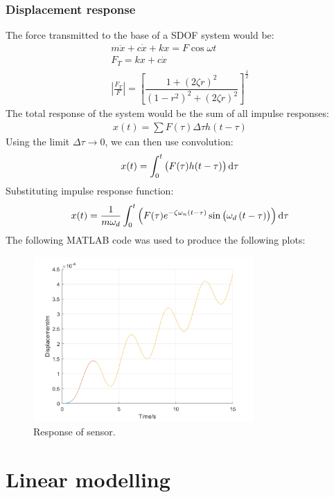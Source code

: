\documentclass[11pt]{article}
\numberwithin{equation}{section}
\begin{document}
\subsubsection{Displacement response}
The force transmitted to the base of a SDOF system would be:
\begin{gather}
    m\ddot{x} + c\dot{x} + kx = F \cos \omega t \\
    F_T = kx + c\dot{x}\\
    \left| \frac{F_T}{F} \right| = \left[\dfrac{1 + \left(2\zeta r\right)^2}{\left(1-r^2\right)^2 + \left(2\zeta r\right)^2}\right]^{\frac{1}{2}}
\end{gather}
The total response of the system would be the sum of all impulse responses:
\begin{gather}
    x(t) = \sum F(\tau) \Delta \tau h \left( t - \tau\right)
\end{gather}
Using the limit $\Delta \tau \rightarrow 0$, we can then use convolution:
\begin{gather}
    x(t) = \int_0^t \left(F(\tau)h(t-\tau)\right)\dif \tau
\end{gather}
Substituting impulse response function:
\begin{gather}
    x(t) = \frac{1}{m\omega_d}\int_0^t \left(F(\tau)e^{-\zeta \omega_n (t - \tau)}\sin \left(\omega_d\left(t-\tau\right)\right)\right)\dif \tau
\end{gather}
The following MATLAB code was used to produce the following plots:

\begin{figure}[H]
    \centering
    \includegraphics[width = 0.75\textwidth]{./img/q1e.png}
    \caption{Response of sensor.}
\end{figure}
\section{Linear modelling}
\end{document}
